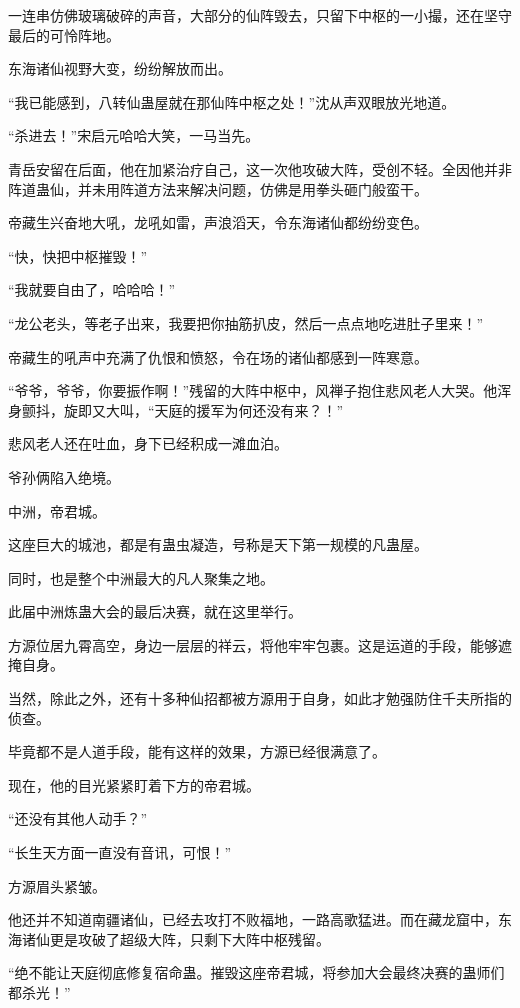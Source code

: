 \begin{this_body}
一连串仿佛玻璃破碎的声音，大部分的仙阵毁去，只留下中枢的一小撮，还在坚守最后的可怜阵地。

东海诸仙视野大变，纷纷解放而出。

“我已能感到，八转仙蛊屋就在那仙阵中枢之处！”沈从声双眼放光地道。

“杀进去！”宋启元哈哈大笑，一马当先。

青岳安留在后面，他在加紧治疗自己，这一次他攻破大阵，受创不轻。全因他并非阵道蛊仙，并未用阵道方法来解决问题，仿佛是用拳头砸门般蛮干。

帝藏生兴奋地大吼，龙吼如雷，声浪滔天，令东海诸仙都纷纷变色。

“快，快把中枢摧毁！”

“我就要自由了，哈哈哈！”

“龙公老头，等老子出来，我要把你抽筋扒皮，然后一点点地吃进肚子里来！”

帝藏生的吼声中充满了仇恨和愤怒，令在场的诸仙都感到一阵寒意。

“爷爷，爷爷，你要振作啊！”残留的大阵中枢中，风禅子抱住悲风老人大哭。他浑身颤抖，旋即又大叫，“天庭的援军为何还没有来？！”

悲风老人还在吐血，身下已经积成一滩血泊。

爷孙俩陷入绝境。

中洲，帝君城。

这座巨大的城池，都是有蛊虫凝造，号称是天下第一规模的凡蛊屋。

同时，也是整个中洲最大的凡人聚集之地。

此届中洲炼蛊大会的最后决赛，就在这里举行。

方源位居九霄高空，身边一层层的祥云，将他牢牢包裹。这是运道的手段，能够遮掩自身。

当然，除此之外，还有十多种仙招都被方源用于自身，如此才勉强防住千夫所指的侦查。

毕竟都不是人道手段，能有这样的效果，方源已经很满意了。

现在，他的目光紧紧盯着下方的帝君城。

“还没有其他人动手？”

“长生天方面一直没有音讯，可恨！”

方源眉头紧皱。

他还并不知道南疆诸仙，已经去攻打不败福地，一路高歌猛进。而在藏龙窟中，东海诸仙更是攻破了超级大阵，只剩下大阵中枢残留。

“绝不能让天庭彻底修复宿命蛊。摧毁这座帝君城，将参加大会最终决赛的蛊师们都杀光！”


\end{this_body}
